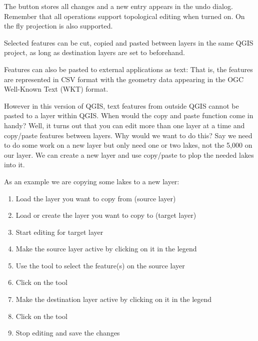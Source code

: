 The  button stores all changes and a new entry appears in the undo
dialog. Remember that all operations support topological editing when turned on. On
the fly projection is also supported.


Selected features can be cut, copied and pasted between layers in the
same QGIS project, as long as destination layers are set to 
 beforehand.

Features can also be pasted to external applications as text:  That is,
the features are represented in CSV format with the geometry data appearing 
in the OGC Well-Known Text (WKT) format.

However in this version of QGIS, text features from outside QGIS cannot 
be pasted to a layer within QGIS. When would the copy and paste function 
come in handy? Well, it turns out that you can edit more than one layer 
at a time and copy/paste features between layers. Why would we want to do 
this?  Say we need to do some work on a new layer but only need one or 
two lakes, not the 5,000 on our  layer. We can create 
a new layer and use copy/paste to plop the needed lakes into it. 

As an example we are copying some lakes to a new layer:

\begin{enumerate}
\item Load the layer you want to copy from (source layer)
\item Load or create the layer you want to copy to (target layer) 
\item Start editing for target layer
\item Make the source layer active by clicking on it in the legend 
\item Use the  tool to select the feature(s) on the source layer
\item Click on the  tool
\item Make the destination layer active by clicking on it in the legend 
\item Click on the  tool 
\item Stop editing and save the changes
\end{enumerate}

